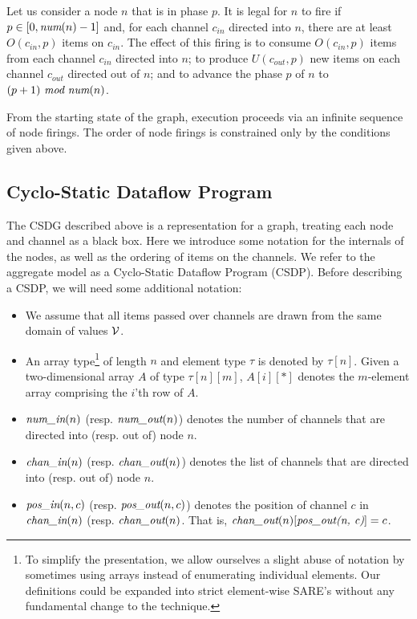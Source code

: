 Let us consider a node $n$ that is in phase $p$.  It is legal for $n$
to fire if $p \in [0, \mbox{\it num}(n)-1]$ and, for each channel $c_{in}$
directed into $n$, there are at least $O(c_{in}, p)$ items on
$c_{in}$.  The effect of this firing is to consume $O(c_{in}, p)$
items from each channel $c_{in}$ directed into $n$; to produce
$U(c_{out}, p)$ new items on each channel $c_{out}$ directed out of
$n$; and to advance the phase $p$ of $n$ to $(p +
1)~\mbox{\it mod}~\mbox{\it num}(n)$.

From the starting state of the graph, execution proceeds via an
infinite sequence of node firings.  The order of node firings is
constrained only by the conditions given above.

\subsection{Cyclo-Static Dataflow Program}

The CSDG described above is a representation for a graph, treating
each node and channel as a black box.  Here we introduce some notation
for the internals of the nodes, as well as the ordering of items on
the channels.  We refer to the aggregate model as a Cyclo-Static
Dataflow Program (CSDP).  Before describing a CSDP, we will need some
additional notation:
\begin{itemize}

\item We assume that all items passed over channels are drawn from the
same domain of values ${\cal V}$.

\item An array type\footnote{To simplify the presentation, we allow
ourselves a slight abuse of notation by sometimes using arrays instead
of enumerating individual elements.  Our definitions could be expanded
into strict element-wise SARE's without any fundamental change to the
technique.} of length $n$ and element type $\tau$ is denoted by
$\tau[n]$.  Given a two-dimensional array $A$ of type $\tau[n][m]$,
$A[i][*]$ denotes the $m$-element array comprising the $i$'th row of
$A$.

\item $\mbox{\it num\_in}(n)$ (resp. $\mbox{\it num\_out}(n)$) denotes the number of
channels that are directed into (resp. out of) node $n$.

\item $\mbox{\it chan\_in}(n)$ (resp. $\mbox{\it chan\_out}(n)$) denotes the list of
channels that are directed into (resp. out of) node $n$.

\item $\mbox{\it pos\_in}(n, c)$ (resp. $\mbox{\it pos\_out}(n, c)$) denotes the
position of channel $c$ in $\mbox{\it chan\_in}(n)$
(resp. $\mbox{\it chan\_out}(n)$.  That is, $\mbox{\it chan\_out}(n)[\mbox{\it pos\_out(n,
c)}] = c$.

\end{itemize}

